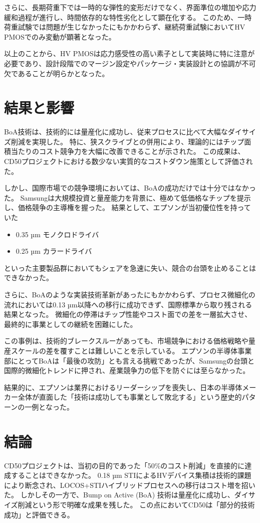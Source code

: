 \documentclass[conference]{IEEEtran}
\begin{document}
さらに、長期荷重下では一時的な弾性的変形だけでなく、界面準位の増加や応力緩和過程が進行し、時間依存的な特性劣化として顕在化する。  
このため、一時荷重試験では問題が生じなかったにもかかわらず、継続荷重試験においてHV PMOSでのみ変動が顕著となった。  

以上のことから、HV PMOSは応力感受性の高い素子として実装時に特に注意が必要であり、設計段階でのマージン設定やパッケージ・実装設計との協調が不可欠であることが明らかとなった。

\section{結果と影響}
BoA技術は、技術的には量産化に成功し、従来プロセスに比べて大幅なダイサイズ削減を実現した。  
特に、狭スクライブとの併用により、理論的にはチップ面積当たりのコスト競争力を大幅に改善できることが示された。  
この成果は、CD50プロジェクトにおける数少ない実質的なコストダウン施策として評価された。

しかし、国際市場での競争環境においては、BoAの成功だけでは十分ではなかった。  
Samsungは大規模投資と量産能力を背景に、極めて低価格なチップを提示し、価格競争の主導権を握った。  
結果として、エプソンが当初優位性を持っていた
\begin{itemize}
  \item 0.35 µm モノクロドライバ
  \item 0.25 µm カラードライバ
\end{itemize}
といった主要製品群においてもシェアを急速に失い、競合の台頭を止めることはできなかった。

さらに、BoAのような実装技術革新があったにもかかわらず、プロセス微細化の流れにおいては0.13 µm以降への移行に成功できず、国際標準から取り残される結果となった。  
微細化の停滞はチップ性能やコスト面での差を一層拡大させ、最終的に事業としての継続を困難にした。

この事例は、技術的ブレークスルーがあっても、市場競争における価格戦略や量産スケールの差を覆すことは難しいことを示している。  
エプソンの半導体事業部にとってBoAは「最後の攻防」とも言える挑戦であったが、Samsungの台頭と国際的微細化トレンドに押され、産業競争力の低下を防ぐには至らなかった。

結果的に、エプソンは業界におけるリーダーシップを喪失し、日本の半導体メーカー全体が直面した「技術は成功しても事業として敗北する」という歴史的パターンの一例となった。

\section{結論}
CD50プロジェクトは、当初の目的であった「50\%のコスト削減」を直接的に達成することはできなかった。  
0.18 µm STIによるHVデバイス集積は技術的課題により断念され、LOCOS+STIハイブリッドプロセスへの移行はコスト増を招いた。  
しかしその一方で、Bump on Active (BoA) 技術は量産化に成功し、ダイサイズ削減という形で明確な成果を残した。  
この点においてCD50は「部分的技術成功」と評価できる。
\end{document}
